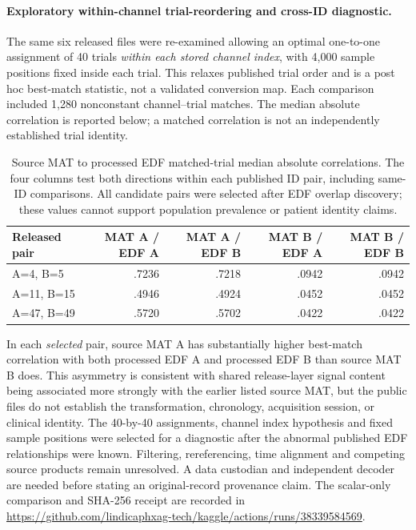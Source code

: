 \paragraph{Exploratory within-channel trial-reordering and cross-ID diagnostic.}
The same six released files were re-examined allowing an optimal
one-to-one assignment of 40 trials \emph{within each stored channel
index}, with 4,000 sample positions fixed inside each trial.
This relaxes published trial order and is a post hoc
best-match statistic, not a validated conversion map.
Each comparison included 1,280 nonconstant channel--trial
matches. The median absolute correlation is reported below;
a matched correlation is not an independently established
trial identity.
\begin{table}[tb]\centering\small
\caption{Source MAT to processed EDF matched-trial median
absolute correlations. The four columns test both directions
within each published ID pair, including same-ID comparisons.
All candidate pairs were selected after EDF overlap discovery;
these values cannot support population prevalence or patient
identity claims.}
\label{tab:p2-cross-release-trial}
\begin{tabular}{lrrrr}
\toprule
Released pair & MAT A / EDF A & MAT A / EDF B &
MAT B / EDF A & MAT B / EDF B\\
\midrule
A=4, B=5   & .7236 & .7218 & .0942 & .0942\\
A=11, B=15 & .4946 & .4924 & .0452 & .0452\\
A=47, B=49 & .5720 & .5702 & .0422 & .0422\\
\bottomrule
\end{tabular}
\end{table}
In each \emph{selected} pair, source MAT A has substantially
higher best-match correlation with both processed EDF A and
processed EDF B than source MAT B does. This asymmetry is
consistent with shared release-layer signal content being
associated more strongly with the earlier listed source MAT,
but the public files do not establish the transformation,
chronology, acquisition session, or clinical identity.
The 40-by-40 assignments, channel index hypothesis and fixed
sample positions were selected for a diagnostic after the
abnormal published EDF relationships were known. Filtering,
rereferencing, time alignment and competing source products
remain unresolved. A data custodian and independent decoder
are needed before stating an original-record provenance claim.
The scalar-only comparison and SHA-256 receipt are recorded in
\url{https://github.com/lindicaphxag-tech/kaggle/actions/runs/38339584569}.
